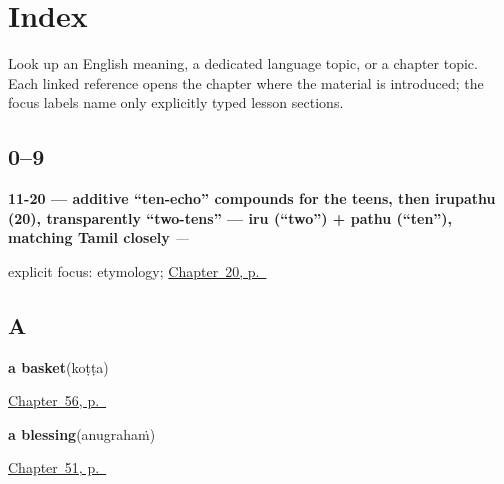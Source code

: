 
\chapter*{Index}

Look up an English meaning, a dedicated language topic, or a chapter topic. Each linked reference opens the chapter where the material is introduced; the focus labels name only explicitly typed lesson sections.

\section*{0--9}

\noindent\begin{minipage}[t]{\linewidth}
\raggedright
\textbf{11-20 — additive \textquotedblleft{}ten-echo\textquotedblright{} compounds for the teens, then irupathu (20), transparently \textquotedblleft{}two-tens\textquotedblright{} — iru (\textquotedblleft{}two\textquotedblright{}) + pathu (\textquotedblleft{}ten\textquotedblright{}), matching Tamil closely}\enspace\emph{ — }\par
\footnotesize explicit focus: etymology; \hyperref[ch:ml-numbers-and-weather]{Chapter~20, p.~\pageref*{ch:ml-numbers-and-weather}}
\end{minipage}\par\smallskip

\section*{A}

\noindent\begin{minipage}[t]{\linewidth}
\raggedright
\textbf{a basket}\enspace\emph{}\enspace(koṭṭa)\par
\footnotesize \hyperref[ch:ml-things-about-the-house]{Chapter~56, p.~\pageref*{ch:ml-things-about-the-house}}
\end{minipage}\par\smallskip

\noindent\begin{minipage}[t]{\linewidth}
\raggedright
\textbf{a blessing}\enspace\emph{}\enspace(anugrahaṁ)\par
\footnotesize \hyperref[ch:ml-courtesy]{Chapter~51, p.~\pageref*{ch:ml-courtesy}}
\end{minipage}\par\smallskip

